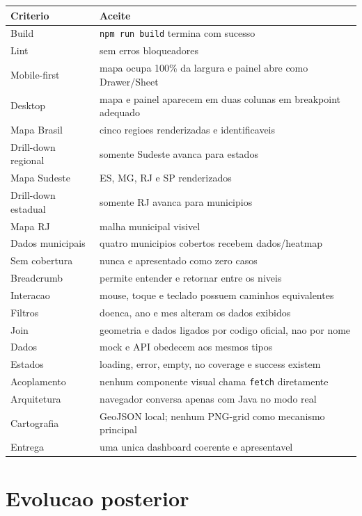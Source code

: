 \documentclass[12pt,a4paper]{article}
\begin{document}
\begin{tabularx}{\textwidth}{@{}L{5cm}Y@{}}
\toprule
\textbf{Criterio} & \textbf{Aceite} \\
\midrule
Build & \texttt{npm run build} termina com sucesso \\
Lint & sem erros bloqueadores \\
Mobile-first & mapa ocupa 100\% da largura e painel abre como Drawer/Sheet \\
Desktop & mapa e painel aparecem em duas colunas em breakpoint adequado \\
Mapa Brasil & cinco regioes renderizadas e identificaveis \\
Drill-down regional & somente Sudeste avanca para estados \\
Mapa Sudeste & ES, MG, RJ e SP renderizados \\
Drill-down estadual & somente RJ avanca para municipios \\
Mapa RJ & malha municipal visivel \\
Dados municipais & quatro municipios cobertos recebem dados/heatmap \\
Sem cobertura & nunca e apresentado como zero casos \\
Breadcrumb & permite entender e retornar entre os niveis \\
Interacao & mouse, toque e teclado possuem caminhos equivalentes \\
Filtros & doenca, ano e mes alteram os dados exibidos \\
Join & geometria e dados ligados por codigo oficial, nao por nome \\
Dados & mock e API obedecem aos mesmos tipos \\
Estados & loading, error, empty, no coverage e success existem \\
Acoplamento & nenhum componente visual chama \texttt{fetch} diretamente \\
Arquitetura & navegador conversa apenas com Java no modo real \\
Cartografia & GeoJSON local; nenhum PNG-grid como mecanismo principal \\
Entrega & uma unica dashboard coerente e apresentavel \\
\bottomrule
\end{tabularx}

\section{Evolucao posterior}
\end{document}
